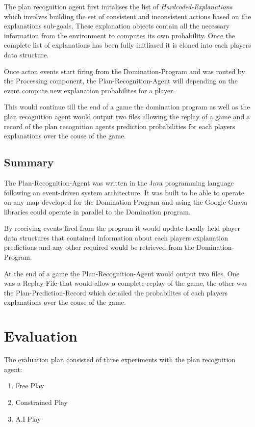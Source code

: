 \documentclass[parskip]{cs4rep}
\begin{document}
The plan recognition agent first initalises the list of \textit{Hardcoded-Explanations} which involves building the set of consistent and inconsistent actions based on the explanations sub-goals. These explanation objects contain all the necessary information from the environment to computes its own probability. Once the complete list of explanations has been fully initliased it is cloned into each players data structure.

Once acton events start firing from the Domination-Program and was routed by the Processing component, the Plan-Recognition-Agent will depending on the event compute new explanation probabilites for a player.

This would continue till the end of a game the domination program as well as the plan recognition agent would output two files allowing the replay of a game and a record of the plan recognition agents prediction probabilities for each players explanations over the couse of the game.

\section{Summary}

The Plan-Recognition-Agent was written in the Java programming language following an event-driven system architecture. It was built to be able to operate on any map developed for the Domination-Program and using the Google Guava libraries could operate in parallel to the Domination program. 

By receiving events fired from the program it would update locally held player data structures that contained information about each players explanation predictions and any other required would be retrieved from the Domination-Program.

At the end of a game the Plan-Recognition-Agent would output two files. One was a Replay-File that would allow a complete replay of the game, the other was the Plan-Prediction-Record which detailed the probabilites of each players explanations over the couse of the game.

\chapter{Evaluation} 

The evaluation plan consisted of three experiments with the plan recognition agent:

\begin{enumerate}
\item
Free Play
\item
Constrained Play
\item
A.I Play
\end{enumerate}
\end{document}
